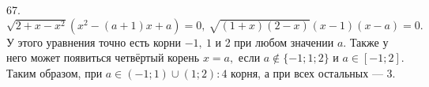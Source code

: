 67. $\sqrt{2+x-x^2}(x^2-(a+1)x+a)=0,\ \sqrt{(1+x)(2-x)}(x-1)(x-a)=0.$ У этого уравнения точно есть корни $-1,\ 1$ и 2 при любом значении $a.$ Также у него
может появиться четвёртый корень $x=a,$ если $a\notin\{-1;1;2\}$ и $a\in[-1;2].$ Таким образом, при $a\in(-1;1)\cup(1;2): 4$ корня, а при всех остальных --- 3.\\
